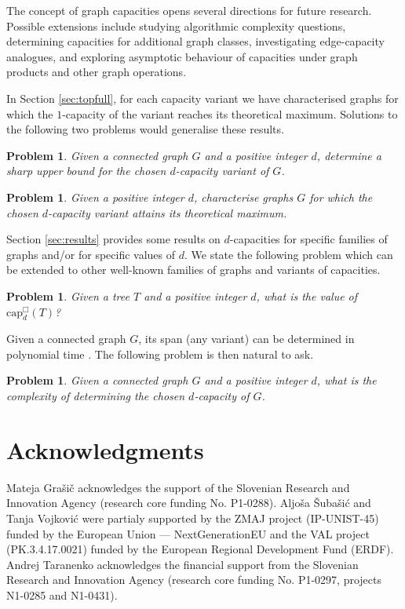 \documentclass{article}
\newtheorem{problem}[theorem]{Problem}
\newcommand{\ccap}[2]{\mathrm{cap}^{\mathbin{\Box}}_{#1}(#2)}
\begin{document}
The concept of graph capacities opens several directions for future research. Possible extensions include studying algorithmic complexity questions, determining capacities for additional graph classes, investigating edge-capacity analogues, and exploring asymptotic behaviour of capacities under graph products and other graph operations. 

In Section \ref{sec:topfull}, for each capacity variant we have characterised graphs for which the $1$-capacity of the variant reaches its theoretical maximum. Solutions to the following two problems would generalise these results.

\begin{problem}
    Given a connected graph $G$ and a positive integer $d$, determine a sharp upper bound for the chosen $d$-capacity variant of $G$. 
\end{problem}

\begin{problem}
    Given a positive integer $d$, characterise graphs $G$ for which the chosen $d$-capacity variant attains its theoretical maximum. 
\end{problem}

Section \ref{sec:results} provides some results on $d$-capacities for specific families of graphs and/or for specific values of $d$. We state the following problem which can be extended to other well-known families of graphs and variants of capacities.

\begin{problem}
    Given a tree $T$ and a positive integer $d$, what is the value of $\ccap{d}{T}$?
\end{problem}


Given a connected graph $G$, its span (any variant) can be determined in polynomial time \cite{BaTa23}. The following problem is then natural to ask.

\begin{problem}
    Given a connected graph $G$ and a positive integer $d$, what is the complexity of determining the chosen $d$-capacity of $G$.
\end{problem}

\section*{Acknowledgments} 
Mateja Gra\v si\v c acknowledges the support of the Slovenian Research and Innovation  Agency (research core funding No. P1-0288). Aljoša Šubašić and Tanja Vojković were partialy supported by the ZMAJ project (IP-UNIST-45) funded by the European Union — NextGenerationEU and the VAL project (PK.3.4.17.0021) funded by the European Regional Development Fund (ERDF). Andrej Taranenko acknowledges the financial support from the Slovenian Research and Innovation Agency (research core funding No. P1-0297, projects N1-0285 and N1-0431).


\end{document}
